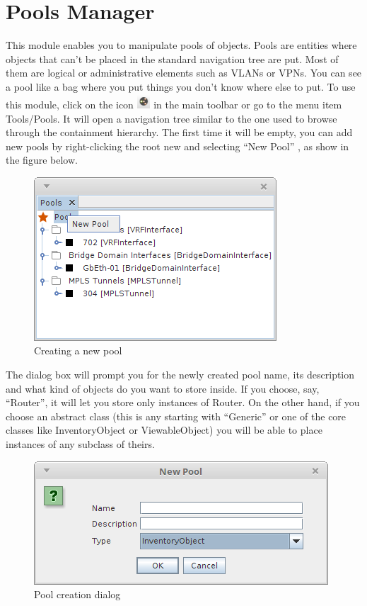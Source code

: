\documentclass[a4paper]{article}
\begin{document}
	\newpage
	\section{Pools Manager} \label{sec:pools_manager}
	This module enables you to manipulate pools of objects. Pools are entities where objects that can't be placed in the standard navigation tree are put. Most of them are logical or administrative elements such as VLANs or VPNs. You can see a pool like a bag where you put things you don't know where else to put. To use this module, click on the icon  \includegraphics[width=0.5cm]{img/icon_pools_manager.png} in the main toolbar or go to the menu item Tools/Pools. It will open a navigation tree similar to the one used to browse through the containment hierarchy. The first time it will be empty, you can add new pools by right-clicking the root new and selecting “New Pool” , as show in the figure below.
	\begin{figure}[h!]
		\centering
		\includegraphics[width=0.5\linewidth]{img/pools_actions.png}
		\caption{Creating a new pool}
		\label{fig:pools_actions}
	\end{figure}
	
	The dialog box will prompt you for the newly created pool name, its description and what kind of objects do you want to store inside. If you choose, say, “Router”, it will let you store only instances of Router. On the other hand, if you choose an abstract class (this is any starting with “Generic” or one of the core classes like InventoryObject or ViewableObject) you will be able to place instances of any subclass of theirs. 
	\begin{figure}[h!]
		\centering
		\includegraphics[width=0.5\linewidth]{img/pools_create_new_pool.png}
		\caption{Pool creation dialog}
		\label{fig:pools_create_new_pool}
	\end{figure}
	
\end{document}
